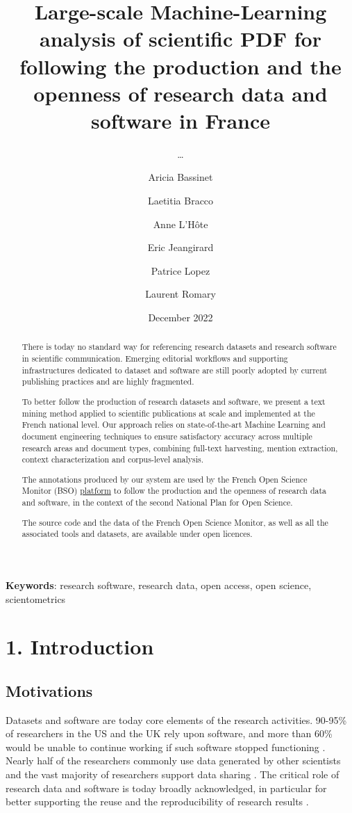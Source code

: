 \documentclass[
]{article}
\title{Large-scale Machine-Learning analysis of scientific PDF for
following the production and the openness of research data and software
in France}
\subtitle{\ldots{}}
\author[%
  2%
  ]{%
  Aricia Bassinet%
}
\author[%
  2%
  ]{%
  Laetitia Bracco%
}
\author[%
  1%
  ]{%
  Anne L'Hôte%
}
\author[%
  1%
  ]{%
  Eric Jeangirard%
}
\author[%
  3%
  ]{%
  Patrice Lopez%
}
\author[%
  4%
  ]{%
  Laurent Romary%
}
\affil[1]{French Ministry of Higher Education, Research, Paris, France}
\affil[2]{University of Lorraine, France}
\affil[3]{science-miner, France}
\affil[4]{Inria, France}
\date{December 2022}
\begin{document}
\maketitle
\begin{abstract}
There is today no standard way for referencing research datasets and
research software in scientific communication. Emerging editorial
workflows and supporting infrastructures dedicated to dataset and
software are still poorly adopted by current publishing practices and
are highly fragmented.

To better follow the production of research datasets and software, we
present a text mining method applied to scientific publications at scale
and implemented at the French national level. Our approach relies on
state-of-the-art Machine Learning and document engineering techniques to
ensure satisfactory accuracy across multiple research areas and document
types, combining full-text harvesting, mention extraction, context
characterization and corpus-level analysis.

The annotations produced by our system are used by the French Open
Science Monitor (BSO)
\href{https://frenchopensciencemonitor.esr.gouv.fr}{platform} to follow
the production and the openness of research data and software, in the
context of the second National Plan for Open Science.

The source code and the data of the French Open Science Monitor, as well
as all the associated tools and datasets, are available under open
licences.
\end{abstract}

\textbf{Keywords}: research software, research data, open access, open
science, scientometrics

\hypertarget{introduction}{%
\section{1. Introduction}\label{introduction}}

\hypertarget{motivations}{%
\subsection{Motivations}\label{motivations}}

Datasets and software are today core elements of the research
activities. 90-95\% of researchers in the US and the UK rely upon
software, and more than 60\% would be unable to continue working if such
software stopped functioning \citep{olivier_philippe_2019_2585783}.
Nearly half of the researchers commonly use data generated by other
scientists \citep{science_2011} and the vast majority of researchers
support data sharing \citep{10.1371/journal.pone.0134826}. The critical
role of research data and software is today broadly acknowledged, in
particular for better supporting the reuse and the reproducibility of
research results \citep[,][]{LAURINAVICHYUTE2022104332}.
\end{document}
